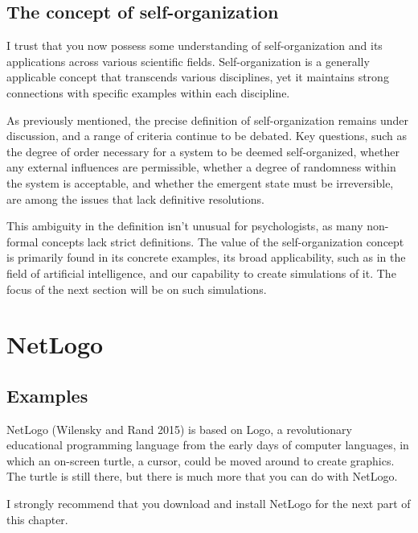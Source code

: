 \documentclass[
  letterpaper,
]{scrbook}
\begin{document}
\hypertarget{the-concept-of-self-organization}{%
\subsection{The concept of
self-organization}\label{the-concept-of-self-organization}}

I trust that you now possess some understanding of self-organization and
its applications across various scientific fields. Self-organization is
a generally applicable concept that transcends various disciplines, yet
it maintains strong connections with specific examples within each
discipline.

As previously mentioned, the precise definition of self-organization
remains under discussion, and a range of criteria continue to be
debated. Key questions, such as the degree of order necessary for a
system to be deemed self-organized, whether any external influences are
permissible, whether a degree of randomness within the system is
acceptable, and whether the emergent state must be irreversible, are
among the issues that lack definitive resolutions.

This ambiguity in the definition isn't unusual for psychologists, as
many non-formal concepts lack strict definitions. The value of the
self-organization concept is primarily found in its concrete examples,
its broad applicability, such as in the field of artificial
intelligence, and our capability to create simulations of it. The focus
of the next section will be on such simulations.

\hypertarget{netlogo}{%
\section{NetLogo}\label{netlogo}}

\hypertarget{examples}{%
\subsection{Examples}\label{examples}}

NetLogo (Wilensky and Rand 2015) is based on Logo, a revolutionary
educational programming language from the early days of computer
languages, in which an on-screen turtle, a cursor, could be moved around
to create graphics. The turtle is still there, but there is much more
that you can do with NetLogo.

I strongly recommend that you download and install NetLogo for the next
part of this chapter.
\end{document}
